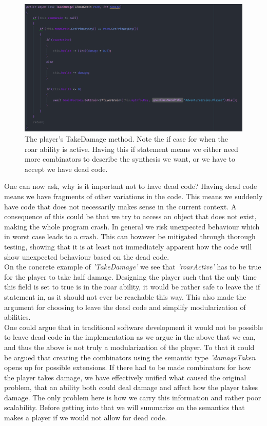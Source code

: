 \begin{figure}[H]
	\centering
	\includegraphics[width=0.9\linewidth]{Materials/Decomposition/TakeDamage}
	\caption{The player's TakeDamage method. Note the if case for when the roar ability is active. Having this if statement means we either need more combinators to describe the synthesis we want, or we have to accept we have dead code. }
	\label{PlayerTakeDamage}
\end{figure}
One can now ask, why is it important not to have dead code? Having dead code means we have fragments of other variations in the code. This means we suddenly have code that does not necessarily makes sense in the current context. A consequence of this could be that we try to access an object that does not exist, making the whole program crash. In general we risk unexpected behaviour which in worst case leads to a crash. This can however be mitigated through thorough testing, showing that it is at least not immediately apparent how the code will show unexpected behaviour based on the dead code.\\
On the concrete example of \textit{'TakeDamage'} we see that \textit{'roarActive'} has to be true for the player to take half damage. Designing the player such that the only time this field is set to true is in the roar ability, it would be rather safe to leave the if statement in, as it should not ever be reachable this way. This also made the argument for choosing to leave the dead code and simplify modularization of abilities.\\
One could argue that in traditional software development it would not be possible to leave dead code in the implementation as we argue in the above that we can, and thus the above is not truly a modularization of the player. To that it could be argued that creating the combinators using the semantic type \textit{'damageTaken} opens up for possible extensions. If there had to be made combinators for how the player takes damage, we have effectively unified what caused the original problem, that an ability both could deal damage and affect how the player takes damage. The only problem here is how we carry this information and rather poor scalability. Before getting into that we will summarize on the semantics that makes a player if we would not allow for dead code.\\
